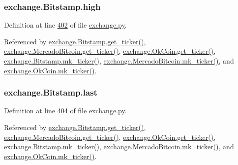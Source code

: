 \subsubsection[{\texorpdfstring{high}{high}}]{\setlength{\rightskip}{0pt plus 5cm}exchange.\+Bitstamp.\+high}\hypertarget{classexchange_1_1_bitstamp_a05de034d34b384373aeb26a28b60cad0}{}\label{classexchange_1_1_bitstamp_a05de034d34b384373aeb26a28b60cad0}


Definition at line \hyperlink{exchange_8py_source_l00402}{402} of file \hyperlink{exchange_8py_source}{exchange.\+py}.



Referenced by \hyperlink{exchange_8py_source_l00409}{exchange.\+Bitstamp.\+get\+\_\+ticker()}, \hyperlink{exchange_8py_source_l00543}{exchange.\+Mercado\+Bitcoin.\+get\+\_\+ticker()}, \hyperlink{exchange_8py_source_l00608}{exchange.\+Ok\+Coin.\+get\+\_\+ticker()}, \hyperlink{exchange_8py_source_l00423}{exchange.\+Bitstamp.\+mk\+\_\+ticker()}, \hyperlink{exchange_8py_source_l00557}{exchange.\+Mercado\+Bitcoin.\+mk\+\_\+ticker()}, and \hyperlink{exchange_8py_source_l00622}{exchange.\+Ok\+Coin.\+mk\+\_\+ticker()}.

\subsubsection[{\texorpdfstring{last}{last}}]{\setlength{\rightskip}{0pt plus 5cm}exchange.\+Bitstamp.\+last}\hypertarget{classexchange_1_1_bitstamp_acf669ec9b8b50638dc19dec5fd40ab04}{}\label{classexchange_1_1_bitstamp_acf669ec9b8b50638dc19dec5fd40ab04}


Definition at line \hyperlink{exchange_8py_source_l00404}{404} of file \hyperlink{exchange_8py_source}{exchange.\+py}.



Referenced by \hyperlink{exchange_8py_source_l00409}{exchange.\+Bitstamp.\+get\+\_\+ticker()}, \hyperlink{exchange_8py_source_l00543}{exchange.\+Mercado\+Bitcoin.\+get\+\_\+ticker()}, \hyperlink{exchange_8py_source_l00608}{exchange.\+Ok\+Coin.\+get\+\_\+ticker()}, \hyperlink{exchange_8py_source_l00423}{exchange.\+Bitstamp.\+mk\+\_\+ticker()}, \hyperlink{exchange_8py_source_l00557}{exchange.\+Mercado\+Bitcoin.\+mk\+\_\+ticker()}, and \hyperlink{exchange_8py_source_l00622}{exchange.\+Ok\+Coin.\+mk\+\_\+ticker()}.

